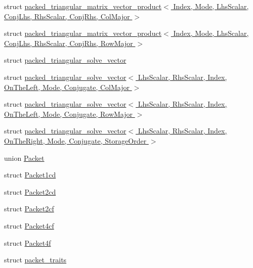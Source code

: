 \begin{DoxyCompactItemize}
\item 
struct \hyperlink{struct_eigen_1_1internal_1_1packed__triangular__matrix__vector__product_3_01_index_00_01_mode_00bec3a0963b0a27d1079bfcbb3d0202cf}{packed\+\_\+triangular\+\_\+matrix\+\_\+vector\+\_\+product$<$ Index, Mode, Lhs\+Scalar, Conj\+Lhs, Rhs\+Scalar, Conj\+Rhs, Col\+Major $>$}
\item 
struct \hyperlink{struct_eigen_1_1internal_1_1packed__triangular__matrix__vector__product_3_01_index_00_01_mode_00f4369f0f3f5b783c4128c16d4e97f7b3}{packed\+\_\+triangular\+\_\+matrix\+\_\+vector\+\_\+product$<$ Index, Mode, Lhs\+Scalar, Conj\+Lhs, Rhs\+Scalar, Conj\+Rhs, Row\+Major $>$}
\item 
struct \hyperlink{struct_eigen_1_1internal_1_1packed__triangular__solve__vector}{packed\+\_\+triangular\+\_\+solve\+\_\+vector}
\item 
struct \hyperlink{struct_eigen_1_1internal_1_1packed__triangular__solve__vector_3_01_lhs_scalar_00_01_rhs_scalar_04173d9937406f96b80cda304747c263c}{packed\+\_\+triangular\+\_\+solve\+\_\+vector$<$ Lhs\+Scalar, Rhs\+Scalar, Index, On\+The\+Left, Mode, Conjugate, Col\+Major $>$}
\item 
struct \hyperlink{struct_eigen_1_1internal_1_1packed__triangular__solve__vector_3_01_lhs_scalar_00_01_rhs_scalar_0cc30126adce0eb996f2d749aee4cc739}{packed\+\_\+triangular\+\_\+solve\+\_\+vector$<$ Lhs\+Scalar, Rhs\+Scalar, Index, On\+The\+Left, Mode, Conjugate, Row\+Major $>$}
\item 
struct \hyperlink{struct_eigen_1_1internal_1_1packed__triangular__solve__vector_3_01_lhs_scalar_00_01_rhs_scalar_0f79f386eb54adb50749a71b7ad7957d9}{packed\+\_\+triangular\+\_\+solve\+\_\+vector$<$ Lhs\+Scalar, Rhs\+Scalar, Index, On\+The\+Right, Mode, Conjugate, Storage\+Order $>$}
\item 
union \hyperlink{union_eigen_1_1internal_1_1_packet}{Packet}
\item 
struct \hyperlink{struct_eigen_1_1internal_1_1_packet1cd}{Packet1cd}
\item 
struct \hyperlink{struct_eigen_1_1internal_1_1_packet2cd}{Packet2cd}
\item 
struct \hyperlink{struct_eigen_1_1internal_1_1_packet2cf}{Packet2cf}
\item 
struct \hyperlink{struct_eigen_1_1internal_1_1_packet4cf}{Packet4cf}
\item 
struct \hyperlink{struct_eigen_1_1internal_1_1_packet4f}{Packet4f}
\item 
struct \hyperlink{struct_eigen_1_1internal_1_1packet__traits}{packet\+\_\+traits}

\end{DoxyCompactItemize}
